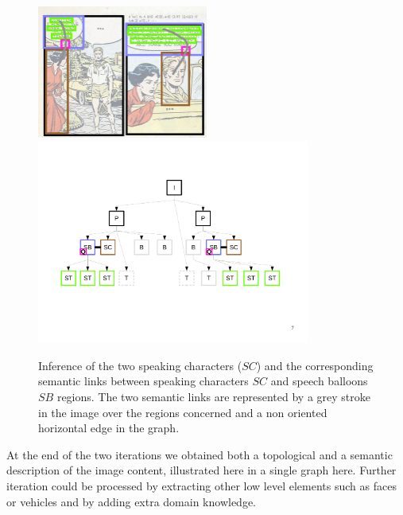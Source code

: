  \begin{figure}[!ht]  %
   \centering
   \includegraphics[trim= 0px 0px 0px 0px, clip, width=0.5\textwidth]{process_illustration_infer_2.png}\\
  \includegraphics[trim= 0px 128px 20px 85px, clip, width=0.8\textwidth]{graph_infer_2.pdf}
  \caption[Inference of the speaking characters ($SC$) and the corresponding semantic links between speaking characters $SC$ and speech balloons $SB$ regions]{Inference of the two speaking characters ($SC$) and the corresponding semantic links between speaking characters $SC$ and speech balloons $SB$ regions.
  The two semantic links are represented by a grey stroke in the image over the regions concerned and a non oriented horizontal edge in the graph.
  }
  \label{fig:kn:final_information}
 \end{figure}

At the end of the two iterations we obtained both a topological and a semantic description of the image content, illustrated here in a single graph here.
Further iteration could be processed by extracting other low level elements such as faces or vehicles and by adding extra domain knowledge.

